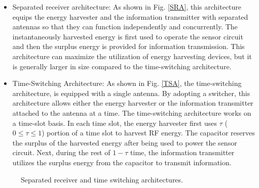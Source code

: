 \documentclass[12pt,draftclsnofoot,onecolumn]{IEEEtran}
\begin{document}
\begin{itemize}

\item{Separated receiver architecture}: As shown in Fig. \ref{SRA}, this architecture equips the energy harvester and the information transmitter with separated antennas so that they can function independently and concurrently. The instantaneously harvested energy is first used to operate the sensor circuit and then the surplus energy is provided for information transmission. This architecture can maximize the utilization of energy harvesting devices, but it is generally larger in size compared to the time-switching architecture.  


\item{Time-Switching Architecture}: As shown in Fig. \ref{TSA}, the time-switching architecture,  is equipped with a single antenna. By adopting a switcher, this architecture allows either the energy harvester or the information transmitter attached to the antenna at a time. The time-switching architecture works on a time-slot basis. In each time slot, the energy harvester first uses $\tau$ ($0\leq\tau\leq 1$) portion of a time slot to harvest RF energy. The capacitor reserves the surplus of the harvested energy after being used to power the sensor circuit.  Next, during the rest of $1-\tau$ time, the information transmitter utilizes the surplus energy from the capacitor to transmit information.




\end{itemize}





\begin{figure} 
\centering
{}  
 \centering
  \centering
\caption{Separated receiver and time switching architectures.} 
\label{receiver_designs}
\end{figure}
\end{document}
